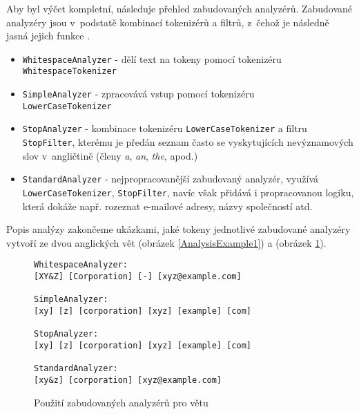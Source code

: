 \documentclass[11pt,oneside]{fithesis2}
\begin{document}
Aby byl výčet kompletní, následuje přehled zabudovaných analyzérů. Zabudované analyzéry jsou v~podstatě kombinací tokenizérů a filtrů, z~čehož je následně jasná jejich funkce  \cite[s.~112]{LuceneAction}.

\begin{itemize}
	\item \texttt{WhitespaceAnalyzer} - dělí text na tokeny pomocí tokenizéru \\ \texttt{WhitespaceTokenizer}
	\item \texttt{SimpleAnalyzer} - zpracovává vstup pomocí tokenizéru \\ \texttt{LowerCaseTokenizer}
	\item \texttt{StopAnalyzer} - kombinace tokenizéru \texttt{LowerCaseTokenizer} a filtru \texttt{StopFilter}, kterému je předán seznam často se vyskytujících nevýznamových slov v~angličtině (členy \emph{a}, \emph{an}, \emph{the}, apod.)
	\item \texttt{StandardAnalyzer} - nejpropracovanější zabudovaný analyzér, využívá \texttt{LowerCaseTokenizer}, \texttt{StopFilter}, navíc však přidává i propracovanou logiku, která dokáže např. rozeznat e-mailové adresy, názvy společností atd.
\end{itemize}

Popis analýzy zakončeme ukázkami, jaké tokeny jednotlivé zabudované analyzéry vytvoří ze dvou anglických vět \emph{} (obrázek \ref{AnalysisExample1}) a \emph{} (obrázek \ref{AnalysisExample2}).

\begin{figure}[!htbp]
\begin{lstlisting}[frame=single]
WhitespaceAnalyzer:
[XY&Z] [Corporation] [-] [xyz@example.com]

SimpleAnalyzer:
[xy] [z] [corporation] [xyz] [example] [com]

StopAnalyzer:
[xy] [z] [corporation] [xyz] [example] [com]

StandardAnalyzer:
[xy&z] [corporation] [xyz@example.com]
\end{lstlisting}
\caption{Použití zabudovaných analyzérů pro větu \emph{}}
\label{AnalysisExample2}
\end{figure}
\end{document}

